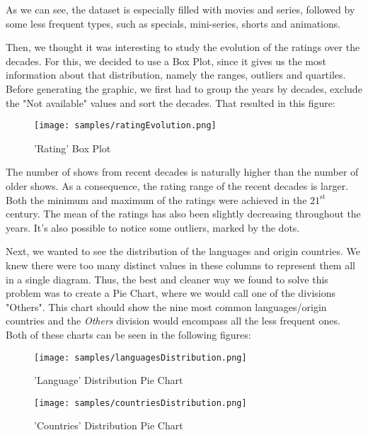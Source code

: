 \documentclass[sigplan,screen]{acmart}
\begin{document}
As we can see, the dataset is especially filled with movies and series, followed by some less frequent types, such as specials, mini-series, shorts and animations.

Then, we thought it was interesting to study the evolution of the ratings over the decades. For this, we decided to use a Box Plot, since it gives us the most information about that distribution, namely the ranges, outliers and quartiles. Before generating the graphic, we first had to group the years by decades, exclude the "Not available" values and sort the decades. That resulted in this figure:

\newpage

\begin{figure}[h]
  \centering
  \texttt{[image: samples/ratingEvolution.png]}
  \caption{'Rating' Box Plot}
\end{figure}

The number of shows from recent decades is naturally higher than the number of older shows. As a consequence, the rating range of the recent decades is larger. Both the minimum and maximum of the ratings were achieved in the $21^{\text{st}}$ century. The mean of the ratings has also been slightly decreasing throughout the years. It's also possible to notice some outliers, marked by the dots.

Next, we wanted to see the distribution of the languages and origin countries. We knew there were too many distinct values in these columns to represent them all in a single diagram. Thus, the best and cleaner way we found to solve this problem was to create a Pie Chart, where we would call one of the divisions "Others". This chart should show the nine most common languages/origin countries and the \emph{Others} division would encompass all the less frequent ones. Both of these charts can be seen in the following figures:

\begin{figure}[h]
  \centering
  \texttt{[image: samples/languagesDistribution.png]}
  \caption{'Language' Distribution Pie Chart}
\end{figure}

\begin{figure}[h]
  \centering
  \texttt{[image: samples/countriesDistribution.png]}
  \caption{'Countries' Distribution Pie Chart}
\end{figure}
\end{document}
